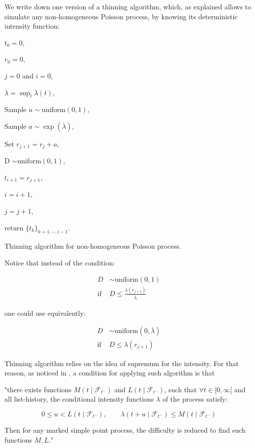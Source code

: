 We write down one version of a thinning algorithm, which, as explained allows to simulate any non-homogeneous Poisson process, by knowing its deterministic intensity function:

\begin{algorithm}[H]
\label{algo:thinning_algo}
\SetAlgoLined
$t_0 = 0$,

$r_0 = 0$,

$j = 0$ and $i = 0$,

$\overline{ \lambda } = \sup_t \lambda( t ) $,

				{Sample $u \sim \text{uniform}(0,1)$, 
				
				Sample $a \sim \exp( \overline{ \lambda } )$,
				
				Set $r_{j+1} = r_j + a$,
				
				D $\sim \text{uniform}(0,1)$,
				
					{$t_{i+1} = r_{j+1}$,
				
					$i = i+1$,
					}
				$j = j+1$,
				}
{ return $\{t_k\}_{k = 1, \cdots, i-1}$. }


\caption{Thinning algorithm for non-homogeneous Poisson process.}
\end{algorithm}

\begin{remarque}
Notice that instead of the condition:

\begin{align*}
D & \sim \text{uniform}(0,1) \\
\text{if } & D \leq \frac {\lambda( r_{j+1} ) } { \overline{\lambda} } 
\end{align*}


one could use equivalently:

\begin{align*}
D & \sim \text{uniform}(0, \overline{\lambda}) \\
\text{if } & D \leq \lambda( r_{j+1} ) 
\end{align*}


\end{remarque}


\begin{remarque}
Thinning algorithm relies on the idea of supremum for the intensity. For that reason, as noticed in \cite{daley}, a condition for applying such algorithm is that 

"there exists functions $M(t \mid \mathcal F_{t^-} )$ and $L(t \mid \mathcal F_{t^-} )$, such that $\forall t \in [0, \infty [$ and all list-history, the conditional intensity functions $\lambda$ of the process satisfy:

$$ 0 \leq u < L(t \mid \mathcal F_{t^-} ), \qquad  \lambda( t + u  \mid \mathcal F_{t^-} )  \leq M( t \mid \mathcal F_{t^-} )  $$

Then for any marked simple point process, the difficulty is reduced to find such functions $M,L$."


\end{remarque}

